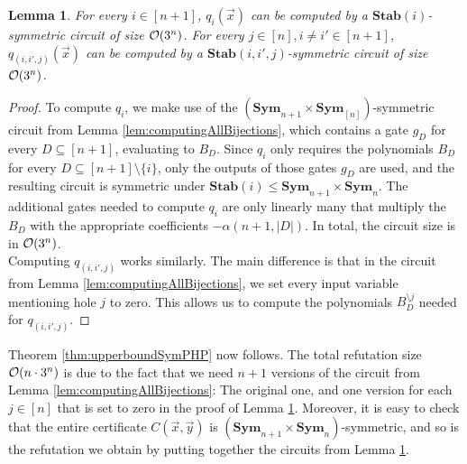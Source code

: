 \documentclass[10pt,a4paper]{article}
\newtheorem{lemma}[theorem]{Lemma}
\newcommand{\Sym}{{\mathbf{Sym}}}
\newcommand{\Oo}{{\cal O}}
\newcommand{\Stab}{\mathbf{Stab}}
\begin{document}
\begin{lemma}
	\label{lem:circuitsizes}
	For every $i \in [n+1]$, $q_i(\vec x)$ can be computed by a $\Stab(i)$-symmetric circuit of size $\Oo(3^n)$. For every $j \in [n], i \neq i' \in [n+1]$, $q_{(i,i',j)}(\vec x)$ can be computed by a $\Stab(i,i',j)$-symmetric circuit of size $\Oo(3^n)$.
\end{lemma}	
\begin{proof}
	To compute $q_i$, we make use of the $(\Sym_{n+1} \times \Sym_[n])$-symmetric circuit from Lemma \ref{lem:computingAllBijections}, which contains a gate $g_D$ for every $D \subseteq [n+1]$, evaluating to $B_D$. Since $q_i$ only requires the polynomials $B_D$ for every $D \subseteq [n+1] \setminus \{i\}$, only the outputs of those gates $g_D$ are used, and the resulting circuit is symmetric under $\Stab(i) \leq \Sym_{n+1} \times \Sym_{n}$. The additional gates needed to compute $q_i$ are only linearly many that multiply the $B_D$ with the appropriate coefficients $-\alpha(n+1,|D|)$. 	
	In total, the circuit size is in $\Oo(3^n)$.\\
	Computing $q_{(i,i',j)}$ works similarly. The main difference is that in the circuit from Lemma \ref{lem:computingAllBijections}, we set every input variable mentioning hole $j$ to zero. This allows us to compute the polynomials $B_D^{\setminus j}$ needed for $q_{(i,i',j)}$. 
\end{proof}	

Theorem \ref{thm:upperboundSymPHP} now follows. The total refutation size $\Oo(n \cdot 3^n)$ is due to the fact that we need $n+1$ versions of the circuit from Lemma \ref{lem:computingAllBijections}: The original one, and one version for each $j \in [n]$ that is set to zero in the proof of Lemma \ref{lem:circuitsizes}. Moreover, it is easy to check that the entire certificate $C(\vec x, \vec y)$ is $(\Sym_{n+1} \times \Sym_{n})$-symmetric, and so is the refutation we obtain by putting together the circuits from Lemma \ref{lem:circuitsizes}.
\end{document}
